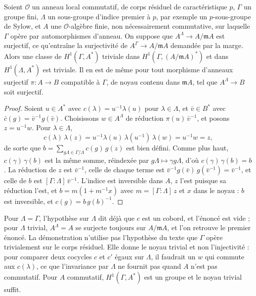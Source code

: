 \begin{encadre}
\begin{enonce}
Soient $\mathcal O$ un anneau local commutatif, de corps résiduel de caractéristique $p$, $\Gamma$ un groupe fini, $\Lambda$ un sous-groupe d'indice premier à $p$, par exemple un $p$-sous-groupe de Sylow, et $A$ une $\mathcal O$-algèbre finie, non nécessairement commutative, sur laquelle $\Gamma$ opère par automorphismes d'anneau. On suppose que $A^\Lambda \to A/\mathfrak mA$ est surjectif, ce qu'entraîne la surjectivité de $A^\Gamma \to A/\mathfrak mA$ demandée par la marge. Alors une classe de $H^1(\Gamma, A^*)$ triviale dans $H^1(\Gamma, (A/\mathfrak mA)^*)$ et dans $H^1(\Lambda, A^*)$ est triviale. Il en est de même pour tout morphisme d'anneaux surjectif $\pi : A \to B$ compatible à $\Gamma$, de noyau contenu dans $\mathfrak mA$, tel que $A^\Lambda \to B$ soit surjectif.
\end{enonce}
\end{encadre}

\begin{proof}
Soient $u \in A^*$ avec $c(\lambda) = u^{-1}\lambda(u)$ pour $\lambda \in \Lambda$, et $\bar v \in B^*$ avec $\bar c(g) = \bar v^{-1} g(\bar v)$. Choisissons $w \in A^\Lambda$ de réduction $\pi(u)\,\bar v^{-1}$, et posons $z = u^{-1}w$. Pour $\lambda \in \Lambda$,
\[
c(\lambda)\,\lambda(z) = u^{-1}\lambda(u)\,\lambda(u^{-1})\,\lambda(w) = u^{-1} w = z ,
\]
de sorte que $b = \sum_{g\Lambda \in \Gamma/\Lambda} c(g)\,g(z)$ est bien défini. Comme plus haut, $c(\gamma)\,\gamma(b)$ est la même somme, réindexée par $g\Lambda \mapsto \gamma g\Lambda$, d'où $c(\gamma)\,\gamma(b) = b$. La réduction de $z$ est $\bar v^{-1}$, celle de chaque terme est $\bar v^{-1}g(\bar v)\,g(\bar v^{-1}) = \bar v^{-1}$, et celle de $b$ est $[\Gamma : \Lambda]\,\bar v^{-1}$. L'indice est inversible dans $A$, $z$ l'est puisque sa réduction l'est, et $b = m(1 + m^{-1}x)$ avec $m = [\Gamma : \Lambda]\,z$ et $x$ dans le noyau : $b$ est inversible, et $c(g) = b\,g(b)^{-1}$.
\end{proof}

Pour $\Lambda = \Gamma$, l'hypothèse sur $\Lambda$ dit déjà que $c$ est un cobord, et l'énoncé est vide ; pour $\Lambda$ trivial, $A^\Lambda = A$ se surjecte toujours sur $A/\mathfrak mA$, et l'on retrouve le premier énoncé. La démonstration n'utilise pas l'hypothèse du texte que $\Gamma$ opère trivialement sur le corps résiduel. Elle donne le noyau trivial et non l'injectivité : pour comparer deux cocycles $c$ et $c'$ égaux sur $\Lambda$, il faudrait un $w$ qui commute aux $c(\lambda)$, ce que l'invariance par $\Lambda$ ne fournit pas quand $A$ n'est pas commutatif. Pour $A$ commutatif, $H^1(\Gamma, A^*)$ est un groupe et le noyau trivial suffit.

